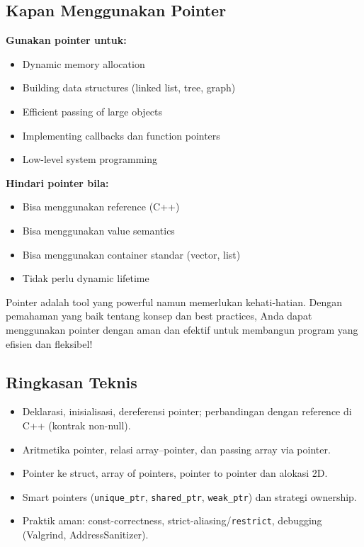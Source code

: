 \documentclass[../main.tex]{subfiles}
\begin{document}
\subsection{Kapan Menggunakan Pointer}

\textbf{Gunakan pointer untuk:}
\begin{itemize}
  \item Dynamic memory allocation
  \item Building data structures (linked list, tree, graph)
  \item Efficient passing of large objects
  \item Implementing callbacks dan function pointers
  \item Low-level system programming
\end{itemize}

\textbf{Hindari pointer bila:}
\begin{itemize}
  \item Bisa menggunakan reference (C++)
  \item Bisa menggunakan value semantics
  \item Bisa menggunakan container standar (vector, list)
  \item Tidak perlu dynamic lifetime
\end{itemize}

Pointer adalah tool yang powerful namun memerlukan kehati-hatian. Dengan pemahaman yang baik tentang konsep dan best practices, Anda dapat menggunakan pointer dengan aman dan efektif untuk membangun program yang efisien dan fleksibel!

\subsection{Ringkasan Teknis}

\begin{itemize}
  \item Deklarasi, inisialisasi, dereferensi pointer; perbandingan dengan reference di C++ (kontrak non-null).
  \item Aritmetika pointer, relasi array–pointer, dan passing array via pointer.
  \item Pointer ke struct, array of pointers, pointer to pointer dan alokasi 2D.
  \item Smart pointers (\texttt{unique\_ptr}, \texttt{shared\_ptr}, \texttt{weak\_ptr}) dan strategi ownership.
  \item Praktik aman: const-correctness, strict-aliasing/\texttt{restrict}, debugging (Valgrind, AddressSanitizer).
\end{itemize}
\end{document}
